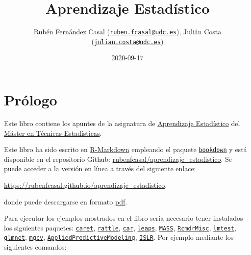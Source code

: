 \documentclass[]{book}
\title{Aprendizaje Estadístico}
\author{Rubén Fernández Casal
(\href{mailto:ruben.fcasal@udc.es}{\nolinkurl{ruben.fcasal@udc.es}}),
Julián Costa
(\href{mailto:julian.costa@udc.es}{\nolinkurl{julian.costa@udc.es}})}
\date{2020-09-17}
\theoremstyle{break}
\theoremstyle{definition}
\theoremstyle{definition}
\theoremstyle{definition}
\theoremstyle{remark}
\begin{document}
\maketitle

{
\setcounter{tocdepth}{1}
\tableofcontents
}
\chapter*{Prólogo}\label{pruxf3logo}

Este libro contiene los apuntes de la asignatura de
\href{http://eamo.usc.es/pub/mte/index.php?option=com_content\&view=article\&id=74}{Aprendizaje
Estadístico} del \href{http://eio.usc.es/pub/mte}{Máster en Técnicas
Estadísticas}.

Este libro ha sido escrito en
\href{http://rmarkdown.rstudio.com}{R-Markdown} empleando el paquete
\href{https://bookdown.org/yihui/bookdown/}{\texttt{bookdown}} y está
disponible en el repositorio Github:
\href{https://github.com/rubenfcasal/aprendizaje_estadistico}{rubenfcasal/aprendizaje\_estadistico}.
Se puede acceder a la versión en línea a través del siguiente enlace:

\url{https://rubenfcasal.github.io/aprendizaje_estadistico}.

donde puede descargarse en formato
\href{https://rubenfcasal.github.io/aprendizaje_estadistico/aprendizaje_estadistico.pdf}{pdf}.

Para ejecutar los ejemplos mostrados en el libro sería necesario tener
instalados los siguientes paquetes:
\href{https://CRAN.R-project.org/package=caret}{\texttt{caret}},
\href{https://CRAN.R-project.org/package=rattle}{\texttt{rattle}},
\href{https://CRAN.R-project.org/package=car}{\texttt{car}},
\href{https://CRAN.R-project.org/package=leaps}{\texttt{leaps}},
\href{https://CRAN.R-project.org/package=MASS}{\texttt{MASS}},
\href{https://CRAN.R-project.org/package=RcmdrMisc}{\texttt{RcmdrMisc}},
\href{https://CRAN.R-project.org/package=lmtest}{\texttt{lmtest}},
\href{https://CRAN.R-project.org/package=glmnet}{\texttt{glmnet}},
\href{https://CRAN.R-project.org/package=mgcv}{\texttt{mgcv}},
\href{https://CRAN.R-project.org/package=AppliedPredictiveModeling}{\texttt{AppliedPredictiveModeling}},
\href{https://CRAN.R-project.org/package=ISLR}{\texttt{ISLR}}. Por
ejemplo mediante los siguientes comandos:
\end{document}

